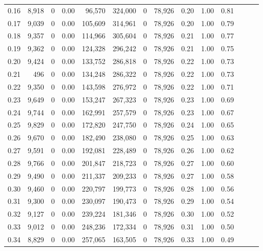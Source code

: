 \begin{tabular}{rrrrrrrrrrrrrr}
0.16 &  8,918 &      0 &  0.00 &   96,570 &  324,000 &       0 &  78,926 &  0.20 &  1.00 &      0.81 \\
0.17 &  9,039 &      0 &  0.00 &  105,609 &  314,961 &       0 &  78,926 &  0.20 &  1.00 &      0.79 \\
0.18 &  9,357 &      0 &  0.00 &  114,966 &  305,604 &       0 &  78,926 &  0.21 &  1.00 &      0.77 \\
0.19 &  9,362 &      0 &  0.00 &  124,328 &  296,242 &       0 &  78,926 &  0.21 &  1.00 &      0.75 \\
0.20 &  9,424 &      0 &  0.00 &  133,752 &  286,818 &       0 &  78,926 &  0.22 &  1.00 &      0.73 \\
0.21 &    496 &      0 &  0.00 &  134,248 &  286,322 &       0 &  78,926 &  0.22 &  1.00 &      0.73 \\
0.22 &  9,350 &      0 &  0.00 &  143,598 &  276,972 &       0 &  78,926 &  0.22 &  1.00 &      0.71 \\
0.23 &  9,649 &      0 &  0.00 &  153,247 &  267,323 &       0 &  78,926 &  0.23 &  1.00 &      0.69 \\
0.24 &  9,744 &      0 &  0.00 &  162,991 &  257,579 &       0 &  78,926 &  0.23 &  1.00 &      0.67 \\
0.25 &  9,829 &      0 &  0.00 &  172,820 &  247,750 &       0 &  78,926 &  0.24 &  1.00 &      0.65 \\
0.26 &  9,670 &      0 &  0.00 &  182,490 &  238,080 &       0 &  78,926 &  0.25 &  1.00 &      0.63 \\
0.27 &  9,591 &      0 &  0.00 &  192,081 &  228,489 &       0 &  78,926 &  0.26 &  1.00 &      0.62 \\
0.28 &  9,766 &      0 &  0.00 &  201,847 &  218,723 &       0 &  78,926 &  0.27 &  1.00 &      0.60 \\
0.29 &  9,490 &      0 &  0.00 &  211,337 &  209,233 &       0 &  78,926 &  0.27 &  1.00 &      0.58 \\
0.30 &  9,460 &      0 &  0.00 &  220,797 &  199,773 &       0 &  78,926 &  0.28 &  1.00 &      0.56 \\
0.31 &  9,300 &      0 &  0.00 &  230,097 &  190,473 &       0 &  78,926 &  0.29 &  1.00 &      0.54 \\
0.32 &  9,127 &      0 &  0.00 &  239,224 &  181,346 &       0 &  78,926 &  0.30 &  1.00 &      0.52 \\
0.33 &  9,012 &      0 &  0.00 &  248,236 &  172,334 &       0 &  78,926 &  0.31 &  1.00 &      0.50 \\
0.34 &  8,829 &      0 &  0.00 &  257,065 &  163,505 &       0 &  78,926 &  0.33 &  1.00 &      0.49 \\

\end{tabular}
